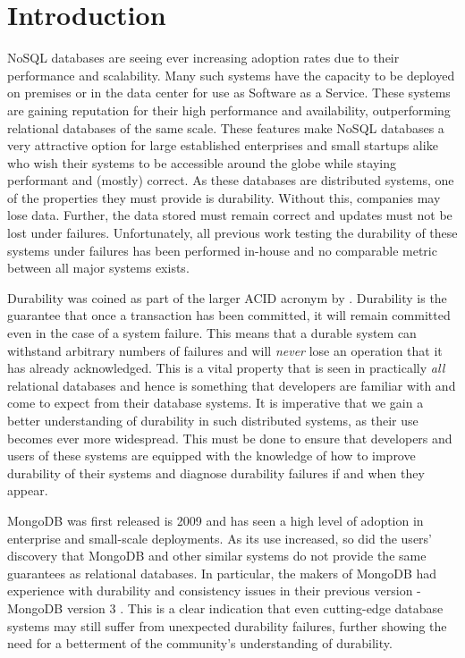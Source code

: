 \chapter{Introduction}

NoSQL databases are seeing ever increasing adoption rates due to their performance and scalability. Many such systems have the capacity to be deployed on premises or in the data center for use as Software as a Service. These systems are gaining reputation for their high performance and availability, outperforming relational databases of the same scale. These features make NoSQL databases a very attractive option for large established enterprises and small startups alike who wish their systems to be accessible around the globe while staying performant and (mostly) correct. As these databases are distributed systems, one of the properties they must provide is durability. Without this, companies may lose data. Further, the data stored must remain correct and updates must not be lost under failures. Unfortunately, all previous work testing the durability of these systems under failures has been performed in-house and no comparable metric between all major systems exists.

Durability was coined as part of the larger ACID acronym by \citet{acid}. Durability is the guarantee that once a transaction has been committed, it will remain committed even in the case of a system failure. This means that a durable system can withstand arbitrary numbers of failures and will \textit{never} lose an operation that it has already acknowledged. This is a vital property that is seen in practically \textit{all} relational databases and hence is something that developers are familiar with and come to expect from their database systems. It is imperative that we gain a better understanding of durability in such distributed systems, as their use becomes ever more widespread. This must be done to ensure that developers and users of these systems are equipped with the knowledge of how to improve durability of their systems and diagnose durability failures if and when they appear.

MongoDB was first released is 2009 and has seen a high level of adoption in enterprise and small-scale deployments. As its use increased, so did the users' discovery that MongoDB and other similar systems do not provide the same guarantees as relational databases. In particular, the makers of MongoDB had experience with durability and consistency issues in their previous version - MongoDB version 3 \citep{jepsen-2017, jepsen-2018}. This is a clear indication that even cutting-edge database systems may still suffer from unexpected durability failures, further showing the need for a betterment of the community's understanding of durability.

